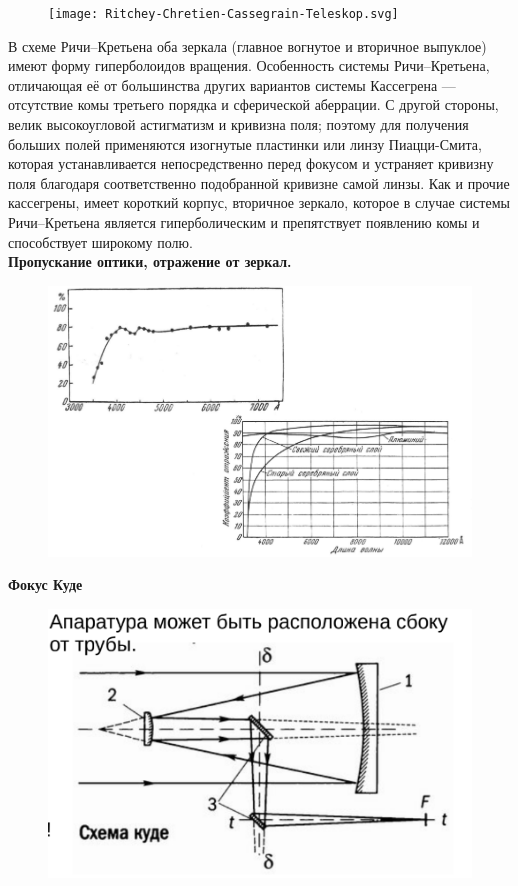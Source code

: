 \documentclass[12pt]{article}
\begin{document}
\begin{figure}[h]
	\centering
	\texttt{[image: Ritchey-Chretien-Cassegrain-Teleskop.svg]}
\end{figure}
В схеме Ричи--Кретьена оба зеркала (главное вогнутое и
вторичное выпуклое) имеют форму
гиперболоидов вращения. Особенность системы Ричи--Кретьена, отличающая её от большинства других вариантов системы Кассегрена — отсутствие комы третьего порядка и сферической аберрации. С другой стороны, велик высокоугловой астигматизм и кривизна поля; поэтому для получения больших полей применяются
изогнутые пластинки или линзу Пиацци-Смита, которая
устанавливается непосредственно перед фокусом и устраняет
кривизну поля благодаря соответственно подобранной кривизне
самой линзы. Как и прочие кассегрены, имеет короткий корпус, вторичное зеркало, которое в случае системы Ричи--Кретьена является гиперболическим и препятствует появлению комы и способствует широкому полю.\\
\textbf{Пропускание оптики,
	отражение от зеркал.}
\begin{figure}[h]
	\centering
	\includegraphics[width=0.9\linewidth]{"Снимок экрана от 2024-12-22 18-05-30"}
\end{figure}
\newpage
\textbf{Фокус Куде}
\begin{figure}[h]
	\centering
	\includegraphics[width=0.7\linewidth]{"Снимок экрана от 2024-12-22 18-06-40"}
\end{figure}\\
\end{document}
